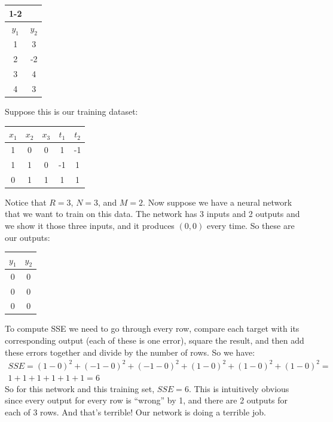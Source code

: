 \documentclass[11pt]{amsart}
\begin{document}
\bigskip
\bigskip


\begin{center}
\begin{tabular}{| c | c | }
\cline{1-2}
\multicolumn{2}{| c | }{outputs}\\
\hline
  $y_1$  & $y_2$  \\
\hline
  1 & 3  \\
\hline
 2 & -2  \\
\hline
 3 & 4 \\
\hline
 4 & 3 \\
\hline
\end{tabular}
\end{center}

\bigskip
\bigskip

Suppose this is our training dataset:

\begin{center}
\begin{tabular}{| c | c | c || c | c | }
\hline
  $x_1$ & $x_2$  & $x_3$  & $t_1$  & $t_2$  \\
\hline
  1  & 0  & 0  & 1  & -1  \\
\hline
  1  & 1 & 0  & -1  & 1  \\
\hline
  0  & 1  &1  & 1  & 1  \\
\hline
\end{tabular}
\end{center}
Notice that $R = 3$, $N=3$, and $M=2$. Now suppose we have a neural network that we want to train on this data. The network has 3 inputs and 2 outputs and we show it those three inputs, and it produces $(0,0)$ every time. So these are our outputs:

\begin{center}
\begin{tabular}{| c | c | }
\hline
  $y_1$ & $y_2$ \\
\hline
  0  & 0  \\
\hline
  0  & 0  \\
\hline
  0  & 0 \\
\hline
\end{tabular}
\end{center}

To compute SSE we need to go through every row, compare each target with its corresponding output (each of these is one error), square the result, and then add these errors together and divide by the number of rows. So we have:
\begin{eqnarray*}
SSE =  (1-0)^2 + (- 1-0)^2 + (-1-0)^2 + (1- 0)^2 + (1-0)^2 + (1 - 0)^2 =  \\ 
1 + 1 + 1 + 1 + 1 + 1 = 6
\end{eqnarray*}
So for this network and this training set, $SSE = 6$. This is intuitively obvious since every output for every row is ``wrong'' by 1, and there are 2 outputs for each of 3 rows. And that's terrible!  Our network is doing a terrible job.
\end{document}
